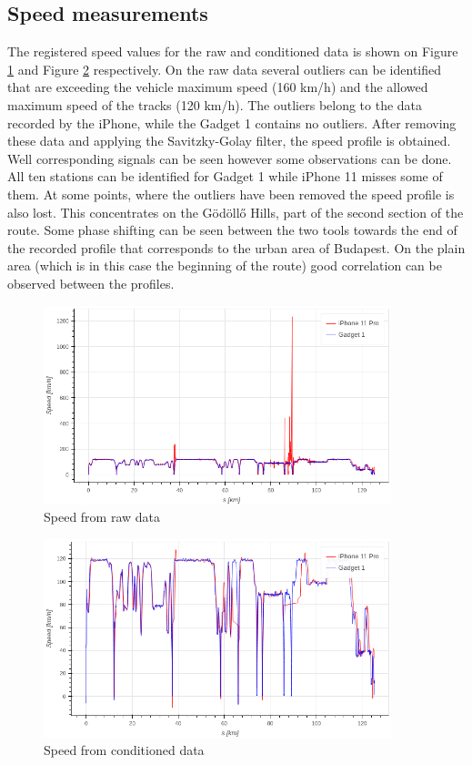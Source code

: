 \documentclass{article}
\begin{document}
		\subsection{Speed measurements}
			The registered speed values for the raw and conditioned data is shown on Figure \ref{fig:raw_speed} and Figure \ref{fig:cond_speed} respectively. On the raw data several outliers can be identified that are exceeding the vehicle maximum speed (160 km/h) and the allowed maximum speed of the tracks (120 km/h). The outliers belong to the data recorded by the iPhone, while the Gadget 1 contains no outliers. After removing these data and applying the Savitzky-Golay filter, the speed profile is obtained. Well corresponding signals can be seen however some observations can be done. All ten stations can be identified for Gadget 1 while iPhone 11 misses some of them. At some points, where the outliers have been removed the speed profile is also lost. This concentrates on the Gödöllő Hills, part of the second section of the route. Some phase shifting can be seen between the two tools towards the end of the recorded profile that corresponds to the urban area of Budapest. On the plain area (which is in this case the beginning of the route) good correlation can be observed between the profiles.
			\begin{figure}[h]
				\centering
		      \includegraphics[width=0.9\textwidth]{raw_speed.png}
		      \caption{Speed from raw data}
		      \label{fig:raw_speed}
			\end{figure}
			\begin{figure}[h]
			   \centering
		      \includegraphics[width=0.9\textwidth]{cond_speed.png}
		      \caption{Speed from conditioned data}
		      \label{fig:cond_speed}
			\end{figure}
\end{document}
